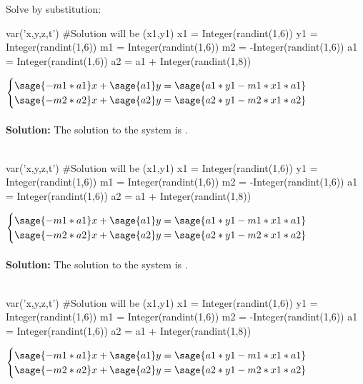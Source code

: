 \documentclass{ximera}
\begin{document}
\noindent Solve by substitution:
\begin{shuffle}
\begin{question}
\begin{sagesilent}
var('x,y,z,t')
#Solution will be (x1,y1)
x1 = Integer(randint(1,6))
y1 = Integer(randint(1,6))
m1 = Integer(randint(1,6))
m2 = -Integer(randint(1,6)) 
a1 = Integer(randint(1,6))
a2 = a1 + Integer(randint(1,8))
\end{sagesilent}

$\begin{cases}
\sage{-m1*a1}x+\sage{a1}y=\sage{a1*y1-m1*x1*a1}\\
\sage{-m2*a2}x+\sage{a2}y=\sage{a2*y1-m2*x1*a2}\\
\end{cases}$\\\\

{\bf Solution:} The solution to the system is 
.\\\\
\end{question}

\begin{question}
\begin{sagesilent}
var('x,y,z,t')
#Solution will be (x1,y1)
x1 = Integer(randint(1,6))
y1 = Integer(randint(1,6))
m1 = Integer(randint(1,6))
m2 = -Integer(randint(1,6)) 
a1 = Integer(randint(1,6))
a2 = a1 + Integer(randint(1,8))
\end{sagesilent}
$\begin{cases}
\sage{-m1*a1}x+\sage{a1}y=\sage{a1*y1-m1*x1*a1}\\
\sage{-m2*a2}x+\sage{a2}y=\sage{a2*y1-m2*x1*a2}\\
\end{cases}$\\\\

{\bf Solution:} The solution to the system is 
.\\\\
\end{question}

\begin{question}
\begin{sagesilent}
var('x,y,z,t')
#Solution will be (x1,y1)
x1 = Integer(randint(1,6))
y1 = Integer(randint(1,6))
m1 = Integer(randint(1,6))
m2 = -Integer(randint(1,6)) 
a1 = Integer(randint(1,6))
a2 = a1 + Integer(randint(1,8))
\end{sagesilent}
$\begin{cases}
\sage{-m1*a1}x+\sage{a1}y=\sage{a1*y1-m1*x1*a1}\\
\sage{-m2*a2}x+\sage{a2}y=\sage{a2*y1-m2*x1*a2}\\
\end{cases}$\\\\


\end{question}
\end{shuffle}
\end{document}
